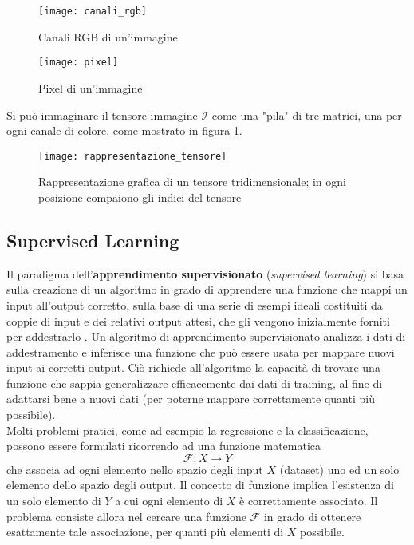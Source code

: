 \begin{figure}
  \begin{minipage}[b]{0.46\textwidth}
    \texttt{[image: canali\_rgb]}
    \caption{Canali RGB di un'immagine}
  \end{minipage}
  \hfill
  \begin{minipage}[b]{0.46\textwidth}
    \texttt{[image: pixel]}
    \caption{Pixel di un'immagine}
  \end{minipage}
\end{figure}

Si può immaginare il tensore immagine $\mathcal{I}$ come una "pila" di tre matrici, una per ogni canale di colore, come mostrato in figura \ref{rappresentazione_tensore}.

\begin{figure}
\centering
\texttt{[image: rappresentazione\_tensore]}
\caption{Rappresentazione grafica di un tensore tridimensionale; in ogni posizione compaiono gli indici del tensore}
\label{rappresentazione_tensore}
\end{figure}

\subsection{Supervised Learning}

Il paradigma dell'\textbf{apprendimento supervisionato} (\textit{supervised learning}) si basa sulla creazione di un algoritmo in grado di apprendere una funzione che mappi un input all'output corretto, sulla base di una serie di esempi ideali costituiti da coppie di input e dei relativi output attesi, che gli vengono inizialmente forniti per addestrarlo \cite{Russell2009}.
Un algoritmo di apprendimento supervisionato analizza i dati di addestramento e inferisce una funzione che può essere usata per mappare nuovi input ai corretti output. Ciò richiede all'algoritmo la capacità di trovare una funzione che sappia generalizzare efficacemente dai dati di training, al fine di adattarsi bene a nuovi dati (per poterne mappare correttamente quanti più possibile).\\

Molti problemi pratici, come ad esempio la regressione e la classificazione, possono essere formulati ricorrendo ad una funzione matematica
\[\mathcal{F}:X\to Y\]
che associa ad ogni elemento nello spazio degli input $X$ (dataset) uno ed un solo elemento dello spazio degli output.
Il concetto di funzione implica l'esistenza di un solo elemento di $Y$ a cui ogni elemento di $X$ è correttamente associato. Il problema consiste allora nel cercare una funzione $\mathcal{F}$ in grado di ottenere esattamente tale associazione, per quanti più elementi di $X$ possibile.

